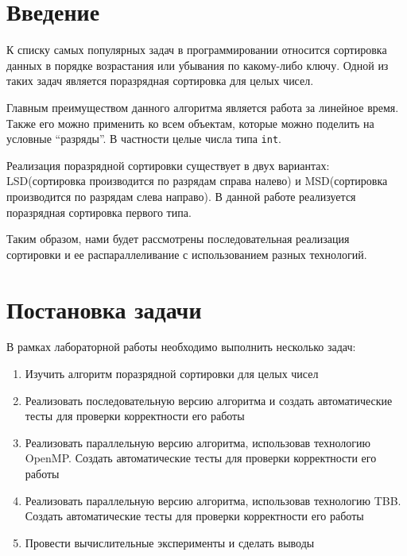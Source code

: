 \documentclass{report}
\begin{document}
\setcounter{page}{2}

\tableofcontents
\newpage

\section*{Введение}
К списку самых популярных задач в программировании относится сортировка данных в порядке возрастания или убывания по какому-либо ключу. Одной из таких задач является поразрядная сортировка для целых чисел.
\par Главным преимуществом данного алгоритма является работа за линейное время. Также его можно применить ко всем объектам, которые можно поделить на условные ``разряды''. В частности целые числа типа \verb|int|.
\par Реализация поразрядной сортировки существует в двух вариантах: LSD(сортировка производится по разрядам справа налево) и MSD(сортировка производится по разрядам слева направо). В данной работе реализуется поразрядная сортировка первого типа.
\par Таким образом, нами будет рассмотрены последовательная реализация сортировки и ее распараллеливание с использованием разных технологий.
\newpage

\section*{Постановка задачи}

В рамках лабораторной работы необходимо выполнить несколько задач:

\begin{enumerate} 

\item Изучить алгоритм поразрядной сортировки для целых чисел
\item Реализовать последовательную версию алгоритма и создать автоматические тесты для проверки корректности его работы
\item Реализовать параллельную версию алгоритма, использовав технологию OpenMP. Создать автоматические тесты для проверки корректности его работы
\item Реализовать параллельную версию алгоритма, использовав технологию TBB. Создать автоматические тесты для проверки корректности его работы
\item Провести вычислительные эксперименты и сделать выводы

\end{enumerate} 
\end{document}
